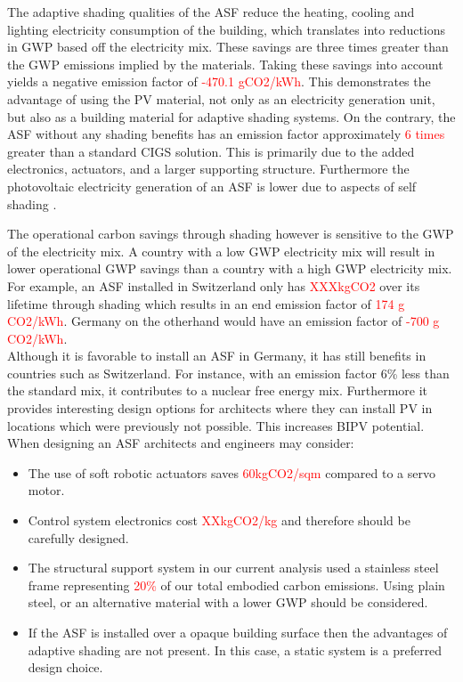 
The adaptive shading qualities of the ASF reduce the heating, cooling and lighting electricity consumption of the building, which translates into reductions in GWP based off the electricity mix. These savings are three times greater than the GWP emissions implied by the materials. Taking these savings into account yields a negative emission factor of \textcolor{red}{-470.1 gCO2/kWh}. This demonstrates the advantage of using the PV material, not only as an electricity generation unit, but also as a building material for adaptive shading systems. On the contrary, the ASF without any shading benefits has an emission factor approximately \textcolor{red}{6 times} greater than a standard CIGS solution. This is primarily due to the added electronics, actuators, and a larger supporting structure. Furthermore the photovoltaic electricity generation of an ASF is lower due to aspects of self shading \cite{hofer2015photovoltaics}. 

The operational carbon savings through shading however is sensitive to the GWP of the electricity mix. A country with a low GWP electricity mix will result in lower operational GWP savings than a country with a high GWP electricity mix. For example, an ASF installed in Switzerland only has \textcolor{red}{XXXkgCO2} over its lifetime through shading which results in an end emission factor of \textcolor{red}{174 g CO2/kWh}. Germany on the otherhand would have an emission factor of \textcolor{red}{-700 g CO2/kWh}.\\

Although it is favorable to install an ASF in Germany, it has still benefits in countries such as Switzerland. For instance, with an emission factor 6\% less than the standard mix, it contributes to a nuclear free energy mix. Furthermore it provides interesting design options for architects where they can install PV in locations which were previously not possible. This increases BIPV potential.  \\

When designing an ASF architects and engineers may consider: 
\begin{itemize}
\item The use of soft robotic actuators saves \textcolor{red}{60kgCO2/sqm} compared to a servo motor. 
\item Control system electronics cost \textcolor{red}{XXkgCO2/kg} and therefore should be carefully designed.
\item The structural support system in our current analysis used a stainless steel frame representing \textcolor{red}{20\%} of our total embodied carbon emissions. Using plain steel, or an alternative material with a lower GWP should be considered.
\item If the ASF is installed over a opaque building surface then the advantages of adaptive shading are not present. In this case, a static system is a preferred design choice. 
\end{itemize}


